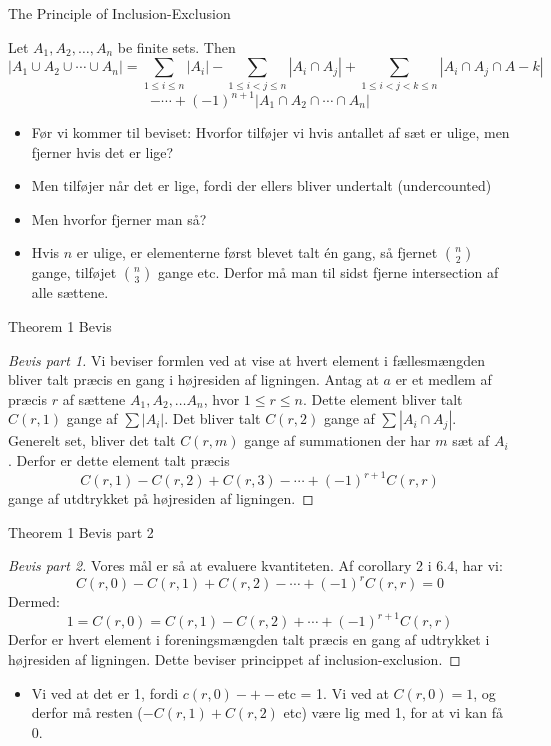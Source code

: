 \documentclass{beamer}
\begin{document}
\begin{frame}{The Principle of Inclusion-Exclusion}
\begin{theorem}
    
  Let $A_1, A_2, \ldots, A_n$   be finite sets. Then
  $$|A_1 \cup A_2 \cup \cdots \cup A_n| = \sum_{1 \leq i \leq n} |A_i| - \sum_{1 \leq i < j \leq n}|A_i \cap A_j| + \sum_{1 \leq i < j < k \leq n} |A_i \cap A_j \cap A-k|$$
  $$- \cdots + (-1)^{n+1} |A_1 \cap A_2 \cap \cdots \cap A_n|$$
\end{theorem}
\begin{itemize}
    \item<1-> Før vi kommer til beviset: Hvorfor tilføjer vi hvis antallet af sæt er ulige, men fjerner hvis det er lige? 
    \item<2-> Men tilføjer når det er lige, fordi der ellers bliver undertalt (undercounted)
    \item<2-> Men hvorfor fjerner man så? 
    \item<2-> Hvis $n$ er ulige, er elementerne først blevet talt én gang, så fjernet $\binom{n}{2}$ gange, tilføjet $\binom{n}{3}$ gange etc. Derfor må man til sidst fjerne intersection af alle sættene. 
\end{itemize}
\end{frame}

\begin{frame}{Theorem 1 Bevis}
\begin{proof}[Bevis part 1]
    Vi beviser formlen ved at vise at hvert element i fællesmængden bliver talt præcis en gang i højresiden af ligningen. 
    Antag at $a$ er et medlem af præcis $r$ af sættene $A_1, A_2, \ldots A_n$, hvor $1 \leq r \leq n$. Dette element bliver talt $C(r,1)$ gange af $\sum|A_i|$. Det bliver talt $C(r,2)$ gange af $\sum|A_i \cap A_j|$. Generelt set, bliver det talt $C(r,m)$  gange af summationen der har $m$ sæt af $A_i$. Derfor er dette element talt præcis
    $$C(r,1) - C(r,2) + C(r,3) - \cdots + (-1)^{r+1}C(r,r)$$
    gange af utdtrykket på højresiden af ligningen. 
\end{proof}
\end{frame}

\begin{frame}{Theorem 1 Bevis part 2}
\begin{proof}[Bevis part 2]
Vores mål er så at evaluere kvantiteten. Af corollary 2 i 6.4, har vi:
$$C(r,0) - C(r,1)+C(r,2)- \cdots + (-1)^rC(r,r) = 0$$
Dermed:
$$1 = C(r,0) = C(r,1) - C(r,2) + \cdots + (-1)^{r+1}C(r,r)$$
Derfor er hvert element i foreningsmængden talt præcis en gang af udtrykket i højresiden af ligningen. Dette beviser princippet af inclusion-exclusion.
\end{proof}
\begin{itemize}
    \item Vi ved at det er 1, fordi $c(r,0) - + - $etc = 1. Vi ved at $C(r,0) = 1$, og derfor må resten ($- C(r,1) + C(r,2)$ etc) være lig med 1, for at vi kan få 0.
\end{itemize}
\end{frame}
\end{document}
